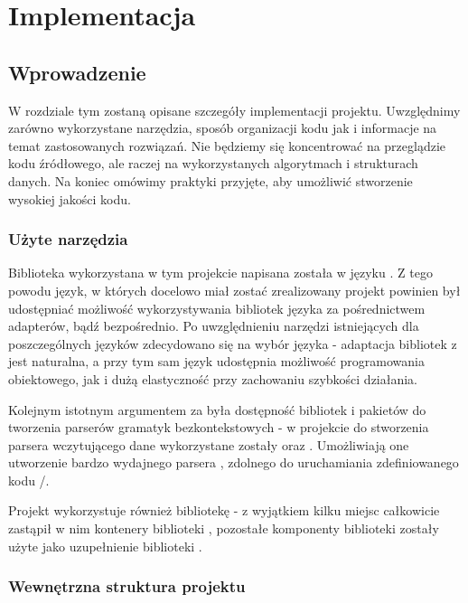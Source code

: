 \documentclass[polish]{standalone}
\begin{document}
\pagestyle{headings}

\chapter{Implementacja}

\section{Wprowadzenie}

W rozdziale tym zostaną opisane szczegóły implementacji projektu. Uwzględnimy zarówno wykorzystane narzędzia, sposób
organizacji kodu jak i informacje na temat zastosowanych rozwiązań. Nie będziemy się koncentrować na przeglądzie kodu
źródłowego, ale raczej na wykorzystanych algorytmach i strukturach danych. Na koniec omówimy praktyki przyjęte, aby
umożliwić stworzenie wysokiej jakości kodu.

\subsection{Użyte narzędzia}

Biblioteka  wykorzystana w tym projekcie napisana została w języku . Z tego powodu język, w których
docelowo miał zostać zrealizowany projekt powinien był udostępniać możliwość wykorzystywania bibliotek języka 
za pośrednictwem adapterów, bądź bezpośrednio. Po uwzględnieniu narzędzi istniejących dla poszczególnych języków
zdecydowano się na wybór języka  - adaptacja bibliotek z  jest naturalna, a przy tym sam język
udostępnia możliwość programowania obiektowego, jak i dużą elastyczność przy zachowaniu szybkości działania.

Kolejnym istotnym argumentem za  była dostępność bibliotek i pakietów do tworzenia parserów gramatyk
bezkontekstowych - w projekcie do stworzenia parsera wczytującego dane wykorzystane zostały  oraz
. Umożliwiają one utworzenie bardzo wydajnego parsera , zdolnego do uruchamiania
zdefiniowanego kodu /.

Projekt wykorzystuje również bibliotekę  - z wyjątkiem kilku miejsc  całkowicie
zastąpił w nim kontenery biblioteki , pozostałe komponenty biblioteki  zostały użyte jako
uzupełnienie biblioteki .

\subsection{Wewnętrzna struktura projektu}
\end{document}
